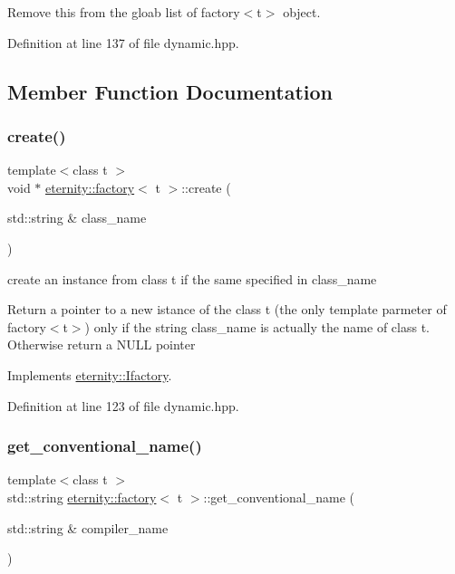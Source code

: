 Remove this from the gloab list of factory$<$t$>$ object. 



Definition at line 137 of file dynamic.\+hpp.



\subsection{Member Function Documentation}
\mbox{\label{classeternity_1_1factory_a08c1c494bc749955f9b0767d31933c2b}} 
\subsubsection{\texorpdfstring{create()}{create()}}
{\footnotesize\ttfamily template$<$class t $>$ \\
void $\ast$ \hyperlink{classeternity_1_1factory}{eternity\+::factory}$<$ t $>$\+::create (\begin{DoxyParamCaption}\item[{std\+::string \&}]{class\+\_\+name }\end{DoxyParamCaption})\hspace{0.3cm}{\ttfamily [virtual]}}



create an instance from class t if the same specified in class\+\_\+name 

Return a pointer to a new istance of the class t (the only template parmeter of factory$<$t$>$) only if the string class\+\_\+name is actually the name of class t. Otherwise return a N\+U\+LL pointer 

Implements \hyperlink{classeternity_1_1_ifactory_afaca5a9abf52fa3a731c3dfed7cb73b3}{eternity\+::\+Ifactory}.



Definition at line 123 of file dynamic.\+hpp.

\mbox{\label{classeternity_1_1factory_a0b7c7bc194b178379eb1b880f87d3b48}} 
\subsubsection{\texorpdfstring{get\+\_\+conventional\+\_\+name()}{get\_conventional\_name()}}
{\footnotesize\ttfamily template$<$class t $>$ \\
std\+::string \hyperlink{classeternity_1_1factory}{eternity\+::factory}$<$ t $>$\+::get\+\_\+conventional\+\_\+name (\begin{DoxyParamCaption}\item[{std\+::string \&}]{compiler\+\_\+name }\end{DoxyParamCaption})\hspace{0.3cm}{\ttfamily [virtual]}}

